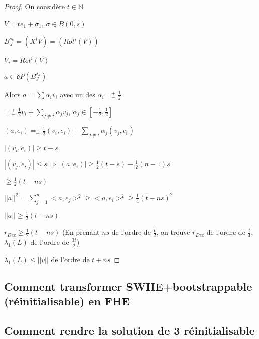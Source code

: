 \begin{proof}
On considère $t \in \mathbb{N}$

$V= t e_1 + \sigma_1$, $\sigma \in B(0,s)$

$B_J^{s_k}=(X^i V)=(Rot^i(V))$

$V_i=Rot^i(V)$

$a \in \mathfrak{d} P(B_J^{s_k})$

Alors $a=\sum \alpha_i v_i$ avec un des $\alpha_i=^+_- \frac{1}{2}$

$=^+_- \frac{1}{2} v_i + \sum_{j \neq i} \alpha_j v_j$, $\alpha_j \in [-\frac{1}{2},\frac{1}{2}]$

$(a,e_i)=^+_- \frac{1}{2}(v_i,e_i)+ \sum_{j  \neq i} \alpha_j (v_j,e_i)$

$|(v_i,e_i)| \geq t-s$ 

$|(v_j,e_i)| \leq s \Rightarrow |(a,e_i)| \geq \frac{1}{2} (t-s)- \frac{1}{2}(n-1)s$

$\geq \frac{1}{2} (t-n s)$

$||a||^2=\sum_{j=1}^n <a,e_j>^2 \geq <a,e_i>^2 \geq \frac{1}{4}(t-n s)^2$

$||a|| \geq \frac{1}{2} (t-n s)$

$r_{Dec} \geq \frac{1}{2} (t - n s)$ (En prenant $n s$ de l'ordre de $\frac{t}{2}$, on trouve $r_{Dec}$ de l'ordre de $\frac{t}{4}$, $\lambda_1(L)$ de l'ordre de $\frac{3 t}{2}$)

$\lambda_1(L) \leq ||v||$ de l'ordre de $t+ n s$
\end{proof}

\subsection{Comment transformer SWHE+bootstrappable (réinitialisable) en FHE}

\subsection{Comment rendre la solution de 3 réinitialisable}
